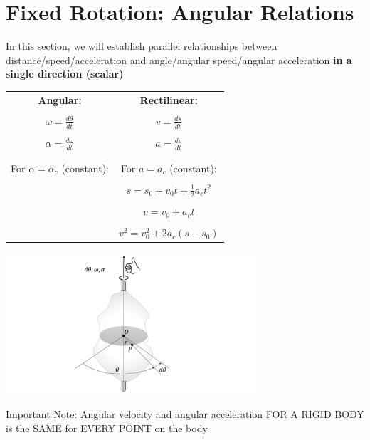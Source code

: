 \documentclass[12pt,letterpaper,twoside]{report}
\begin{document}
\newpage
\section{Fixed Rotation:  Angular Relations}
In this section, we will establish parallel relationships between
distance/speed/acceleration
 and 
angle/angular speed/angular acceleration
\textbf{in a single direction (scalar)}


\begin{minipage}[c]{0.6\textwidth}
\begin{tabular}{  c  c }
\textbf{Angular:} & \textbf{Rectilinear:}\\
 &  \\
$\displaystyle \omega = \frac{d\theta}{dt}$ & $\displaystyle v = \frac{ds}{dt}$\\
 &  \\
$\displaystyle \alpha = \frac{d\omega}{dt}$ & $\displaystyle a = \frac{dv}{dt}$\\
& \\
& \\
 \hspace{1 cm} For $ \alpha = \alpha_c$ (constant): \hspace{1 cm} &  For $a = a_c$ (constant):\\
 & \\
 & $s = s_0 + v_0 t+\frac{1}{2} a_c t^2$\\
  &  \\
 & $v = v_0 + a_c t$\\
 & \\
 & $v^2 = v_0^2 + 2 a_c(s-s_0)$\\
\end{tabular}
\label{tab:singlebest}
\end{minipage}%
\begin{minipage}[c]{0.45\textwidth}
\includegraphics[trim={10cm 0cm 12cm 0cm},clip,width=0.7\textwidth, center]{Slide8} 
\end{minipage}

Important Note:  Angular velocity and angular acceleration FOR A RIGID BODY is the SAME for EVERY POINT on the body
\end{document}
